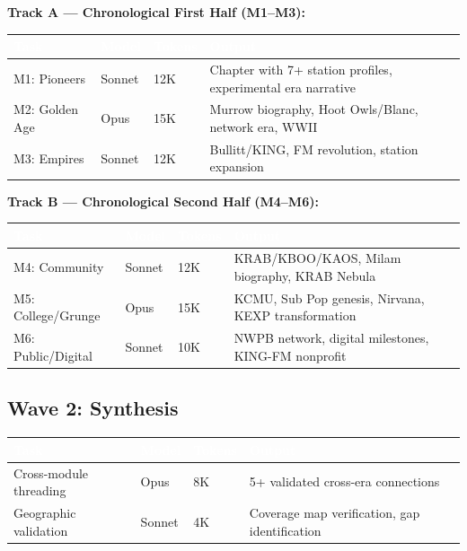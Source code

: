 \documentclass[11pt,letterpaper]{article}
\newcommand{\tableheader}[1]{\textbf{\sffamily\textcolor{white}{#1}}}
\begin{document}
\textbf{Track A --- Chronological First Half (M1--M3):}

\begin{center}
\begin{tabularx}{\textwidth}{L{3cm}L{2cm}C{1.5cm}X}
\toprule
{}
\tableheader{Task} & \tableheader{Model} & \tableheader{Tokens} & \tableheader{Output} \\
\midrule
M1: Pioneers & Sonnet & 12K & Chapter with 7+ station profiles, experimental era narrative \\
M2: Golden Age & Opus & 15K & Murrow biography, Hoot Owls/Blanc, network era, WWII \\
M3: Empires & Sonnet & 12K & Bullitt/KING, FM revolution, station expansion \\
\bottomrule
\end{tabularx}
\end{center}

\textbf{Track B --- Chronological Second Half (M4--M6):}

\begin{center}
\begin{tabularx}{\textwidth}{L{3cm}L{2cm}C{1.5cm}X}
\toprule
{}
\tableheader{Task} & \tableheader{Model} & \tableheader{Tokens} & \tableheader{Output} \\
\midrule
M4: Community & Sonnet & 12K & KRAB/KBOO/KAOS, Milam biography, KRAB Nebula \\
M5: College/Grunge & Opus & 15K & KCMU, Sub Pop genesis, Nirvana, KEXP transformation \\
M6: Public/Digital & Sonnet & 10K & NWPB network, digital milestones, KING-FM nonprofit \\
\bottomrule
\end{tabularx}
\end{center}

\subsection{Wave 2: Synthesis}

\begin{center}
\begin{tabularx}{\textwidth}{L{3cm}L{2cm}C{1.5cm}X}
\toprule
{}
\tableheader{Task} & \tableheader{Model} & \tableheader{Tokens} & \tableheader{Output} \\
\midrule
Cross-module threading & Opus & 8K & 5+ validated cross-era connections \\
Geographic validation & Sonnet & 4K & Coverage map verification, gap identification \\
\bottomrule
\end{tabularx}
\end{center}
\end{document}
